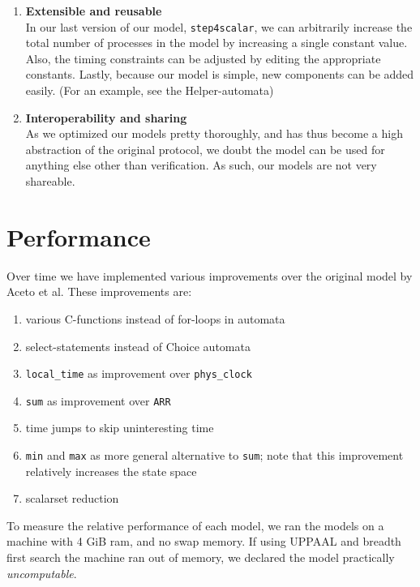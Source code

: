 \documentclass[a4paper,10pt]{article}
\newcommand{\UPPAAL}{UPPAAL\xspace}
\begin{document}
\begin{enumerate}
\item \textbf{Extensible and reusable} \\
	In our last version of our model, \texttt{step4scalar}, we can arbitrarily increase the total number of processes in the model by increasing a single constant value. Also, the timing constraints can be adjusted by editing the appropriate constants. Lastly, because our model is simple, new components can be added easily. (For an example, see the Helper-automata)
\item \textbf{Interoperability and sharing} \\
	As we optimized our models pretty thoroughly, and has thus become a high abstraction of the original protocol, we doubt the model can be used for anything else other than verification. As such, our models are not very shareable.
\end{enumerate}

\section{Performance\label{sec:performance}}


Over time we have implemented various improvements over the original model by Aceto et al. These improvements are:

\begin{enumerate}
\item various C-functions instead of for-loops in automata
\item select-statements instead of Choice automata
\item \texttt{local\_time} as improvement over \texttt{phys\_clock}
\item \texttt{sum} as improvement over \texttt{ARR}
\item time jumps to skip uninteresting time
\item \texttt{min} and \texttt{max} as more general alternative to \texttt{sum}; note that this improvement relatively increases the state space
\item scalarset reduction
\end{enumerate}

To measure the relative performance of each model, we ran the models on a machine with 4 GiB ram, and no swap memory. If using \UPPAAL and breadth first search the machine ran out of memory, we declared the model practically \emph{uncomputable}.
\end{document}
